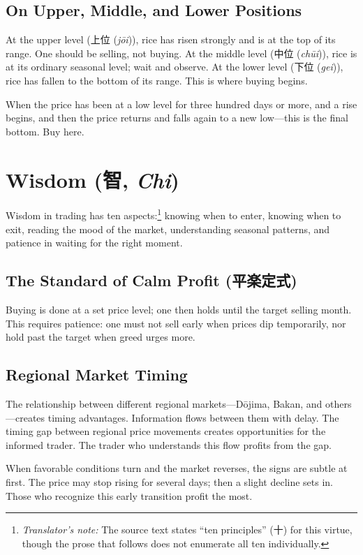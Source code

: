 \documentclass[10pt, openany]{book}
\newcommand{\jp}[1]{{\japanesefont #1}}
\newcommand{\tn}[1]{\footnote{\textit{Translator's note:} #1}}
\newcommand{\jt}[2]{\jp{#1} (\textit{#2})}
\begin{document}
\subsection{On Upper, Middle, and Lower Positions}

At the upper level (\jt{上位}{j\=oi}), rice has risen strongly and is at
the top of its range. One should be selling, not buying. At the middle
level (\jt{中位}{ch\=ui}), rice is at its ordinary seasonal level; wait
and observe. At the lower level (\jt{下位}{gei}), rice has fallen to the
bottom of its range. This is where buying begins.

When the price has been at a low level for three hundred days or more, and a
rise begins, and then the price returns and falls again to a new low---this
is the final bottom. Buy here.

\section{Wisdom (\jp{智}, \textit{Chi})}

Wisdom in trading has ten aspects:\tn{The source text states ``ten
principles'' (\jp{十}) for this virtue, though the prose that follows
does not enumerate all ten individually.} knowing when to enter, knowing
when to exit, reading the mood of the market, understanding seasonal
patterns, and patience in waiting for the right moment.

\subsection{The Standard of Calm Profit (\jp{平楽定式})}

Buying is done at a set price level; one then holds until the target
selling month. This requires patience: one must not sell early when prices
dip temporarily, nor hold past the target when greed urges more.

\subsection{Regional Market Timing}

The relationship between different regional markets---D\=ojima, Bakan, and
others---creates timing advantages. Information flows between them with
delay. The timing gap between regional price movements creates
opportunities for the informed trader. The trader who understands this flow
profits from the gap.

When favorable conditions turn and the market reverses, the signs are subtle
at first. The price may stop rising for several days; then a slight decline
sets in. Those who recognize this early transition profit the most.
\end{document}
